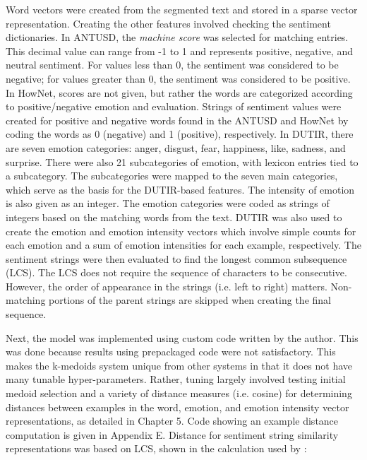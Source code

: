 \documentclass [11pt, proquest] {uwthesis}[2020/02/24]
\begin{document}
\pagebreak
Word vectors were created from the segmented text and stored in a sparse vector representation. Creating the other features involved checking the sentiment dictionaries. In ANTUSD, the \textit{machine score} was selected for matching entries. This decimal value can range from -1 to 1 and represents positive, negative, and neutral sentiment. For values less than 0, the sentiment was considered to be negative; for values greater than 0, the sentiment was considered to be positive. In HowNet, scores are not given, but rather the words are categorized according to positive/negative emotion and evaluation. Strings of sentiment values were created for positive and negative words found in the ANTUSD and HowNet by coding the words as 0 (negative) and 1 (positive), respectively. In DUTIR, there are seven emotion categories: anger, disgust, fear, happiness, like, sadness, and surprise. There were also 21 subcategories of emotion, with lexicon entries tied to a subcategory. The subcategories were mapped to the seven main categories, which serve as the basis for the  DUTIR-based features. The intensity of emotion is also given as an integer. The emotion categories were coded as strings of integers based on the matching words from the text. DUTIR was also used to create the emotion and emotion intensity vectors which involve simple counts for each emotion and a sum of emotion intensities for each example, respectively. The sentiment strings were then evaluated to find the longest common subsequence (LCS). The LCS does not require the sequence of characters to be consecutive. However, the order of appearance in the strings (i.e. left to right) matters. Non-matching portions of the parent strings are skipped when creating the final sequence.

Next, the model was implemented using custom code written by the author. This was done because results using prepackaged code were not satisfactory. This makes the k-medoids system unique from other systems in that it does not have many tunable hyper-parameters. Rather, tuning largely involved testing initial medoid selection and a variety of distance measures (i.e. cosine) for determining distances between examples in the word, emotion, and emotion intensity vector representations, as detailed in Chapter 5. Code showing an example distance computation is given in Appendix E. Distance for sentiment string similarity representations was based on LCS, shown in the calculation used by \cite{Wei2014}:
\end{document}
